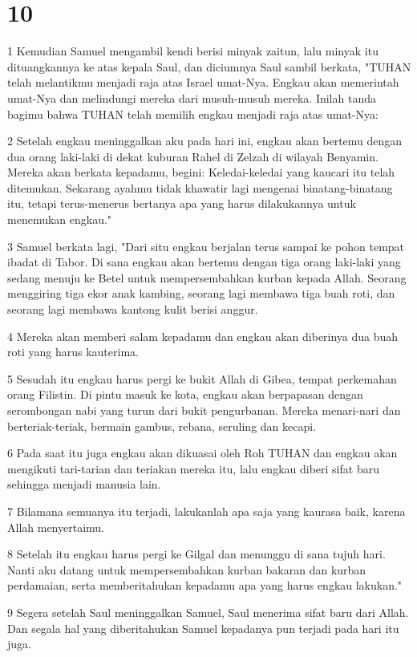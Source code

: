 \chapter{10}

\par 1 Kemudian Samuel mengambil kendi berisi minyak zaitun, lalu minyak itu dituangkannya ke atas kepala Saul, dan diciumnya Saul sambil berkata, "TUHAN telah melantikmu menjadi raja atas Israel umat-Nya. Engkau akan memerintah umat-Nya dan melindungi mereka dari musuh-musuh mereka. Inilah tanda bagimu bahwa TUHAN telah memilih engkau menjadi raja atas umat-Nya:
\par 2 Setelah engkau meninggalkan aku pada hari ini, engkau akan bertemu dengan dua orang laki-laki di dekat kuburan Rahel di Zelzah di wilayah Benyamin. Mereka akan berkata kepadamu, begini: Keledai-keledai yang kaucari itu telah ditemukan. Sekarang ayahmu tidak khawatir lagi mengenai binatang-binatang itu, tetapi terus-menerus bertanya apa yang harus dilakukannya untuk menemukan engkau."
\par 3 Samuel berkata lagi, "Dari situ engkau berjalan terus sampai ke pohon tempat ibadat di Tabor. Di sana engkau akan bertemu dengan tiga orang laki-laki yang sedang menuju ke Betel untuk mempersembahkan kurban kepada Allah. Seorang menggiring tiga ekor anak kambing, seorang lagi membawa tiga buah roti, dan seorang lagi membawa kantong kulit berisi anggur.
\par 4 Mereka akan memberi salam kepadamu dan engkau akan diberinya dua buah roti yang harus kauterima.
\par 5 Sesudah itu engkau harus pergi ke bukit Allah di Gibea, tempat perkemahan orang Filistin. Di pintu masuk ke kota, engkau akan berpapasan dengan serombongan nabi yang turun dari bukit pengurbanan. Mereka menari-nari dan berteriak-teriak, bermain gambus, rebana, seruling dan kecapi.
\par 6 Pada saat itu juga engkau akan dikuasai oleh Roh TUHAN dan engkau akan mengikuti tari-tarian dan teriakan mereka itu, lalu engkau diberi sifat baru sehingga menjadi manusia lain.
\par 7 Bilamana semuanya itu terjadi, lakukanlah apa saja yang kaurasa baik, karena Allah menyertaimu.
\par 8 Setelah itu engkau harus pergi ke Gilgal dan menunggu di sana tujuh hari. Nanti aku datang untuk mempersembahkan kurban bakaran dan kurban perdamaian, serta memberitahukan kepadamu apa yang harus engkau lakukan."
\par 9 Segera setelah Saul meninggalkan Samuel, Saul menerima sifat baru dari Allah. Dan segala hal yang diberitahukan Samuel kepadanya pun terjadi pada hari itu juga.
